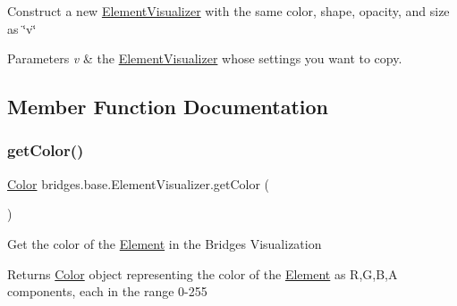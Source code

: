 Construct a new \mbox{\hyperlink{classbridges_1_1base_1_1_element_visualizer}{Element\+Visualizer}} with the same color, shape, opacity, and size as \char`\"{}v\char`\"{}


\begin{DoxyParams}{Parameters}
{\em v} & the \mbox{\hyperlink{classbridges_1_1base_1_1_element_visualizer}{Element\+Visualizer}} whose settings you want to copy. \\
\hline
\end{DoxyParams}


\subsection{Member Function Documentation}
\mbox{\label{classbridges_1_1base_1_1_element_visualizer_a3bf821b9bfa02746882bac934ce4fb8e}} 
\subsubsection{\texorpdfstring{get\+Color()}{getColor()}}
{\footnotesize\ttfamily \mbox{\hyperlink{classbridges_1_1base_1_1_color}{Color}} bridges.\+base.\+Element\+Visualizer.\+get\+Color (\begin{DoxyParamCaption}{ }\end{DoxyParamCaption})}

Get the color of the \mbox{\hyperlink{classbridges_1_1base_1_1_element}{Element}} in the Bridges Visualization

\begin{DoxyReturn}{Returns}
\mbox{\hyperlink{classbridges_1_1base_1_1_color}{Color}} object representing the color of the \mbox{\hyperlink{classbridges_1_1base_1_1_element}{Element}} as R,G,B,A components, each in the range 0-\/255 
\end{DoxyReturn}
\mbox{\label{classbridges_1_1base_1_1_element_visualizer_ab86ff39f17f8d1766670b18be88b5492}} 
